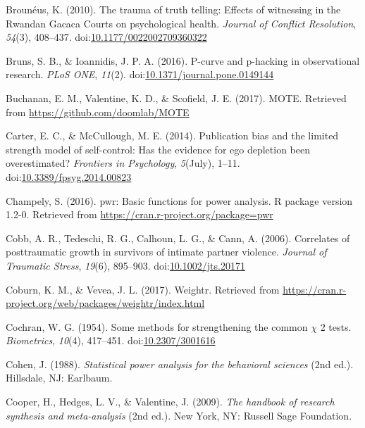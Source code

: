 \documentclass[english,man, mask]{apa6}
\theoremstyle{definition}
\theoremstyle{definition}
\theoremstyle{definition}
\theoremstyle{remark}
\begin{document}
\hypertarget{ref-Brouneus2010}{}
Brounéus, K. (2010). The trauma of truth telling: Effects of witnessing
in the Rwandan Gacaca Courts on psychological health. \emph{Journal of
Conflict Resolution}, \emph{54}(3), 408--437.
doi:\href{https://doi.org/10.1177/0022002709360322}{10.1177/0022002709360322}

\hypertarget{ref-Bruns2016}{}
Bruns, S. B., \& Ioannidis, J. P. A. (2016). P-curve and p-hacking in
observational research. \emph{PLoS ONE}, \emph{11}(2).
doi:\href{https://doi.org/10.1371/journal.pone.0149144}{10.1371/journal.pone.0149144}

\hypertarget{ref-Buchanan2017}{}
Buchanan, E. M., Valentine, K. D., \& Scofield, J. E. (2017). MOTE.
Retrieved from \url{https://github.com/doomlab/MOTE}

\hypertarget{ref-Carter2014}{}
Carter, E. C., \& McCullough, M. E. (2014). Publication bias and the
limited strength model of self-control: Has the evidence for ego
depletion been overestimated? \emph{Frontiers in Psychology},
\emph{5}(July), 1--11.
doi:\href{https://doi.org/10.3389/fpsyg.2014.00823}{10.3389/fpsyg.2014.00823}

\hypertarget{ref-Champely2016}{}
Champely, S. (2016). pwr: Basic functions for power analysis. R package
version 1.2-0. Retrieved from
\url{https://cran.r-project.org/package=pwr}

\hypertarget{ref-Cobb2006}{}
Cobb, A. R., Tedeschi, R. G., Calhoun, L. G., \& Cann, A. (2006).
Correlates of posttraumatic growth in survivors of intimate partner
violence. \emph{Journal of Traumatic Stress}, \emph{19}(6), 895--903.
doi:\href{https://doi.org/10.1002/jts.20171}{10.1002/jts.20171}

\hypertarget{ref-Coburn2017}{}
Coburn, K. M., \& Vevea, J. L. (2017). Weightr. Retrieved from
\url{https://cran.r-project.org/web/packages/weightr/index.html}

\hypertarget{ref-Cochran1954}{}
Cochran, W. G. (1954). Some methods for strengthening the common
\(\chi\) 2 tests. \emph{Biometrics}, \emph{10}(4), 417--451.
doi:\href{https://doi.org/10.2307/3001616}{10.2307/3001616}

\hypertarget{ref-Cohen1988}{}
Cohen, J. (1988). \emph{Statistical power analysis for the behavioral
sciences} (2nd ed.). Hillsdale, NJ: Earlbaum.

\hypertarget{ref-Cooper2009}{}
Cooper, H., Hedges, L. V., \& Valentine, J. (2009). \emph{The handbook
of research synthesis and meta-analysis} (2nd ed.). New York, NY:
Russell Sage Foundation.
\end{document}
